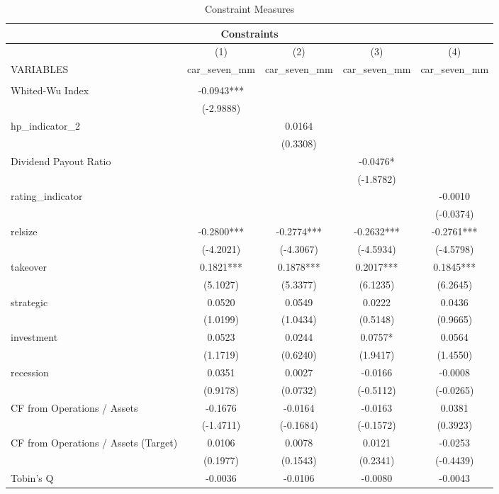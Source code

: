 \documentclass[12pt]{article}
\begin{document}
\begin{table}[ht]
	\centering
	\caption{Constraint Measures}
	\begin{adjustbox}{max width=\textwidth}
		\begin{tabular}{lcccc}
			\multicolumn{5}{c}{Constraints} \\ \hline
			 & (1) & (2) & (3) & (4) \\
			VARIABLES & car\_seven\_mm & car\_seven\_mm & car\_seven\_mm & car\_seven\_mm \\ \hline
			 &  &  &  &  \\
			Whited-Wu Index & -0.0943*** &  &  &  \\
			 & (-2.9888) &  &  &  \\
			hp\_indicator\_2 &  & 0.0164 &  &  \\
			 &  & (0.3308) &  &  \\
			Dividend Payout Ratio &  &  & -0.0476* &  \\
			 &  &  & (-1.8782) &  \\
			rating\_indicator &  &  &  & -0.0010 \\
			 &  &  &  & (-0.0374) \\
			relsize & -0.2800*** & -0.2774*** & -0.2632*** & -0.2761*** \\
			 & (-4.2021) & (-4.3067) & (-4.5934) & (-4.5798) \\
			takeover & 0.1821*** & 0.1878*** & 0.2017*** & 0.1845*** \\
			 & (5.1027) & (5.3377) & (6.1235) & (6.2645) \\
			strategic & 0.0520 & 0.0549 & 0.0222 & 0.0436 \\
			 & (1.0199) & (1.0434) & (0.5148) & (0.9665) \\
			investment & 0.0523 & 0.0244 & 0.0757* & 0.0564 \\
			 & (1.1719) & (0.6240) & (1.9417) & (1.4550) \\
			recession & 0.0351 & 0.0027 & -0.0166 & -0.0008 \\
			 & (0.9178) & (0.0732) & (-0.5112) & (-0.0265) \\
			CF from Operations / Assets & -0.1676 & -0.0164 & -0.0163 & 0.0381 \\
			 & (-1.4711) & (-0.1684) & (-0.1572) & (0.3923) \\
			CF from Operations / Assets (Target) & 0.0106 & 0.0078 & 0.0121 & -0.0253 \\
			 & (0.1977) & (0.1543) & (0.2341) & (-0.4439) \\
			Tobin's Q & -0.0036 & -0.0106 & -0.0080 & -0.0043 \\

\end{tabular}
\end{adjustbox}
\end{table}
\end{document}
